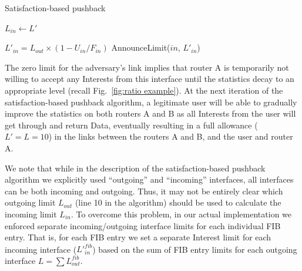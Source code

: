 \documentclass[10pt,conference]{IEEEtran}
\begin{document}
{ 
\begin{algorithm}[t]
\footnotesize
\caption{\small Satisfaction-based pushback}
\label{alg:dynamic limits}
\begin{algorithmic}[1]
\State{} 
\vspace{0.1cm}
  

\vspace{0.1cm}

\State{} 
    \State $L_{in} \leftarrow L'$
\EndFunction

\vspace{0.1cm}

 

        \State $L'_{in}= {L_{out}} \times (1 - U_{in}/F_{in})$
        \State AnnounceLimit($in$, $L'_{in}$)
   \EndFor

\EndFor
\EndFunction

\end{algorithmic}
\end{algorithm}


The zero limit for the adversary's link implies that  router A is temporarily not willing to accept any Interests from this interface until the statistics decay to an appropriate level (recall Fig.~\ref{fig:ratio example}).
At the next iteration of the satisfaction-based pushback algorithm, a legitimate user will be able to gradually improve the statistics on both routers A and B as all Interests from the user will get through and return Data, eventually resulting in a full allowance ($L'=L=10$) in the links between the routers A and B, and the user and router A.

We note that while in the description of the satisfaction-based pushback algorithm we explicitly used ``outgoing'' and ``incoming'' interfaces,  all interfaces can be both incoming and outgoing.
Thus, it may not be entirely clear which outgoing limit $L_{out}$ (line 10 in the algorithm) should be used to calculate the incoming limit $L_{in}$.
To overcome this problem, in our actual implementation we enforced separate incoming/outgoing interface limits for each individual FIB entry.
That is, for each FIB entry we set a separate Interest limit for each incoming interface (${L'}_{in}^{fib}$) based on the sum of FIB entry limits for each outgoing interface $L=\sum{L_{out}^{fib}}$.


}
\end{document}
